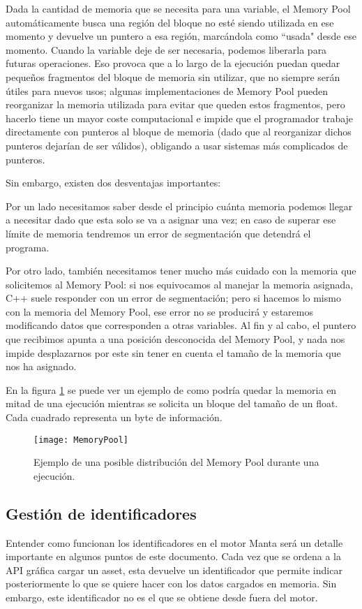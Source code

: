 Dada la cantidad de memoria que se necesita para una variable, el Memory Pool automáticamente busca una región del bloque no esté siendo utilizada en ese momento y devuelve un puntero a esa región, marcándola como ``usada" desde ese momento. Cuando la variable deje de ser necesaria, podemos liberarla para futuras operaciones. Eso provoca que a lo largo de la ejecución puedan quedar pequeños fragmentos del bloque de memoria sin utilizar, que no siempre serán útiles para nuevos usos; algunas implementaciones de Memory Pool pueden reorganizar la memoria utilizada para evitar que queden estos fragmentos, pero hacerlo tiene un mayor coste computacional e impide que el programador trabaje directamente con punteros al bloque de memoria (dado que al reorganizar dichos punteros dejarían de ser válidos), obligando a usar sistemas más complicados de punteros.

Sin embargo, existen dos desventajas importantes:

Por un lado necesitamos saber desde el principio cuánta memoria podemos llegar a necesitar dado que esta solo se va a asignar una vez; en caso de superar ese límite de memoria tendremos un error de segmentación que detendrá el programa.

Por otro lado, también necesitamos tener mucho más cuidado con la memoria que solicitemos al Memory Pool: si nos equivocamos al manejar la memoria asignada, C++ suele responder con un error de segmentación; pero si hacemos lo mismo con la memoria del Memory Pool, ese error no se producirá y estaremos modificando datos que corresponden a otras variables. Al fin y al cabo, el puntero que recibimos apunta a una posición desconocida del Memory Pool, y nada nos impide desplazarnos por este sin tener en cuenta el tamaño de la memoria que nos ha asignado.

En la figura \ref{fig:memory_pool} se puede ver un ejemplo de como podría quedar la memoria en mitad de una ejecución mientras se solicita un bloque del tamaño de un float. Cada cuadrado representa un byte de información.

\begin{figure}[H]
    \centering
    \texttt{[image: MemoryPool]}
    \caption{Ejemplo de una posible distribución del Memory Pool durante una ejecución.}
    \label{fig:memory_pool}
\end{figure}

\subsection{Gestión de identificadores}
\label{manta_id_management}
Entender como funcionan los identificadores en el motor Manta será un detalle importante en algunos puntos de este documento. Cada vez que se ordena a la API gráfica cargar un asset, esta devuelve un identificador que permite indicar posteriormente lo que se quiere hacer con los datos cargados en memoria. Sin embargo, este identificador no es el que se obtiene desde fuera del motor.

